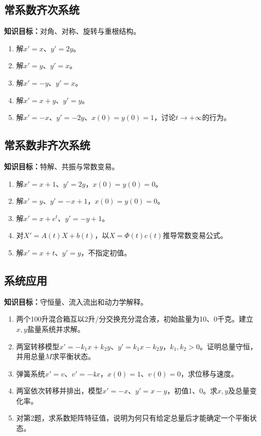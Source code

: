 \documentclass[11pt,a4paper,fontset=fandol]{ctexrep}
\newcommand{\goal}[1]{\textbf{知识目标：}#1\par}
\begin{document}
\subsection{常系数齐次系统}
\goal{对角、对称、旋转与重根结构。}
\begin{enumerate}
\item 解$x'=x$、$y'=2y$。
\item 解$x'=y$、$y'=x$。
\item 解$x'=-y$、$y'=x$。
\item 解$x'=x+y$、$y'=y$。
\item 解$x'=-x$、$y'=-2y$、$x(0)=y(0)=1$，讨论$t\to+\infty$的行为。
\end{enumerate}
\subsection{常系数非齐次系统}
\goal{特解、共振与常数变易。}
\begin{enumerate}
\item 解$x'=x+1$、$y'=2y$，$x(0)=y(0)=0$。
\item 解$x'=y$、$y'=-x+1$，$x(0)=y(0)=0$。
\item 解$x'=x+e^t$、$y'=-y+1$。
\item 对$X'=A(t)X+b(t)$，以$X=\Phi(t)c(t)$推导常数变易公式。
\item 解$x'=x+t$、$y'=y$，不指定初值。
\end{enumerate}
\subsection{系统应用}
\goal{守恒量、流入流出和动力学解释。}
\begin{enumerate}
\item 两个100升混合箱互以2升/分交换充分混合液，初始盐量为10、0千克。建立$x,y$盐量系统并求解。
\item 两室转移模型$x'=-k_1x+k_2y$、$y'=k_1x-k_2y$，$k_1,k_2>0$。证明总量守恒，并用总量$M$求平衡状态。
\item 弹簧系统$x'=v$、$v'=-4x$，$x(0)=1$、$v(0)=0$，求位移与速度。
\item 两室依次转移并排出，模型$x'=-x$、$y'=x-y$，初值1、0。求$x,y$及总量变化率。
\item 对第2题，求系数矩阵特征值，说明为何只有给定总量后才能确定一个平衡状态。
\end{enumerate}
\end{document}
